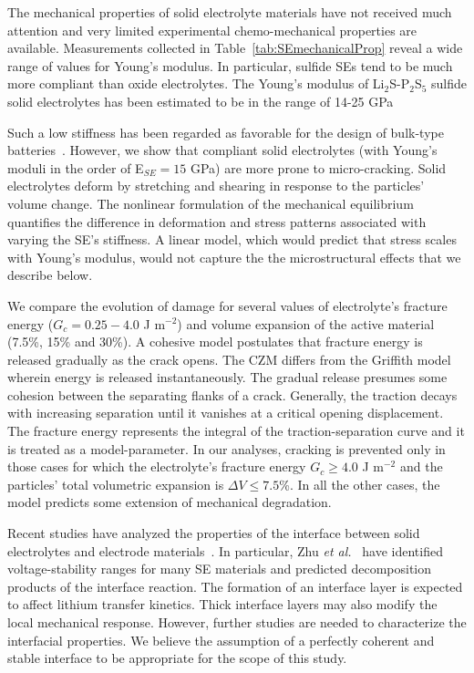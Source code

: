 \documentclass[final,5p,sort&compress]{elsarticle}
\begin{document}
The mechanical properties of solid electrolyte materials have not received much attention and very limited experimental chemo-mechanical properties are available. 
Measurements collected in Table~\ref{tab:SEmechanicalProp} reveal a wide range of values for Young's modulus. In particular, sulfide SEs tend to be much more compliant than oxide electrolytes.
The Young's modulus of Li$_2$S-P$_2$S$_5$ sulfide solid electrolytes 
has been estimated to be in the range of 
14-25 GPa~\cite{Sakuda2013youngMod, McGrogan2016}

Such a low stiffness
has been regarded as favorable
for the design of bulk-type batteries~\cite{Sakuda2013}.
However, we show that compliant solid electrolytes (with Young's moduli in the order of E$_{SE} = 15$ GPa) are more prone to micro-cracking. Solid electrolytes deform by stretching and shearing in response to the particles' volume change.
The nonlinear formulation of the mechanical equilibrium
quantifies the 
difference in deformation and stress patterns 
associated with varying the SE's stiffness.  
A linear model, which would predict that stress scales with Young's modulus, 
would not capture the the microstructural effects that we describe below.

We compare the evolution of damage for several values of electrolyte's fracture energy ($G_c = 0.25 - 4.0$ J m$^{-2}$) and volume expansion of the active material (7.5\%, 15\% and 30\%).
A cohesive model postulates that fracture energy is released gradually as the crack opens. The CZM differs from the Griffith model wherein energy is released instantaneously.
%
The gradual release presumes some cohesion between
the separating flanks of a crack.
Generally, the traction decays with increasing separation until it vanishes at a critical opening displacement. 
The fracture energy represents the integral of the traction-separation curve and it is treated as a model-parameter.
In our analyses, cracking is prevented only 
in those cases for which
the electrolyte's fracture energy $G_c \geq 4.0$ J m$^{-2}$ and the particles' total volumetric expansion is $\Delta V \leq 7.5$\%. In all the other cases, the model predicts some extension of mechanical degradation.

Recent studies have analyzed the properties of the interface between solid electrolytes and electrode materials~\cite{C5TA08574H,RichardsCeder,Wenzel201624}.
In particular, Zhu \emph{et al.}~\cite{C5TA08574H} have identified voltage-stability ranges for many SE materials and predicted decomposition products of the interface reaction.
The formation of an interface layer is expected to affect lithium transfer kinetics. Thick interface layers may also modify the local mechanical response. 
However, further studies are needed to characterize the interfacial properties. We believe the assumption of a perfectly coherent and stable interface to be appropriate for the scope of this study.
\end{document}
